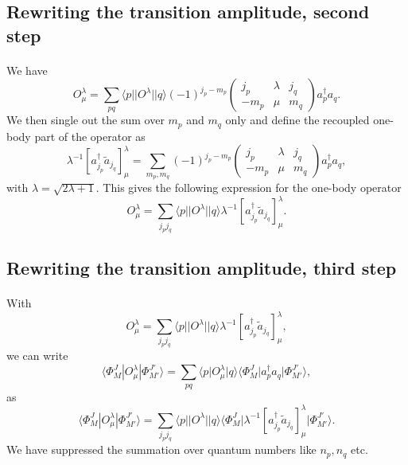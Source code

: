 \documentclass[%
oneside,                 %
final,                   %
10pt]{article}
\begin{document}
\subsection{Rewriting the transition amplitude, second step}

\paragraph{}
We have
\[
O_{\mu}^{\lambda} = \sum_{pq} \langle p \vert \vert O^{\lambda}\vert \vert q \rangle (-1)^{j_p-m_p}\left(\begin{array}{ccc}  j_p & \lambda & j_q \\ -m_p & \mu & m_q\end{array}\right)a^{\dagger}_pa_q.
\]
We then single out the sum over $m_p$ and $m_q$ only and define the recoupled one-body part of the operator as 
\[
\lambda^{-1}\left[ a_{j_p}^{\dagger}\tilde{a}_{j_q}\right]^{\lambda}_{\mu} = \sum_{m_p,m_q} (-1)^{j_p-m_p}\left(\begin{array}{ccc}  j_p & \lambda & j_q \\ -m_p & \mu & m_q\end{array}\right)a^{\dagger}_pa_q,
\]
with $\lambda=\sqrt{2\lambda+1}$.
This gives the following expression for the one-body operator
\[
O_{\mu}^{\lambda} = \sum_{j_pj_q} \langle p \vert \vert O^{\lambda}\vert \vert q \rangle \lambda^{-1}\left[ a_{j_p}^{\dagger}\tilde{a}_{j_q}\right]^{\lambda}_{\mu}.
\]




\subsection{Rewriting the transition amplitude, third step}

\paragraph{}
With 
\[
O_{\mu}^{\lambda} = \sum_{j_pj_q} \langle p \vert \vert O^{\lambda}\vert \vert q \rangle \lambda^{-1}\left[ a_{j_p}^{\dagger}\tilde{a}_{j_q}\right]^{\lambda}_{\mu},
\]
we can write 
\[
\langle \Phi^J_M|O^{\lambda}_{\mu}|\Phi^{J'}_{M'}\rangle = \sum_{pq} \langle p \vert O_{\mu}^{\lambda} \vert q \rangle \langle \Phi_{M}^{J} \vert a^{\dagger}_pa_q \vert \Phi_{M'}^{J'}\rangle,
\]
as
\[
\langle \Phi^J_M|O^{\lambda}_{\mu}|\Phi^{J'}_{M'}\rangle = \sum_{j_pj_q} \langle p \vert \vert O^{\lambda} \vert\vert q \rangle \langle \Phi_{M}^{J}\vert \lambda^{-1}\left[ a_{j_p}^{\dagger}\tilde{a}_{j_q}\right]^{\lambda}_{\mu}  \vert \Phi_{M'}^{J'}\rangle.
\]
We have suppressed the summation over quantum numbers like $n_p,n_q$ etc.
\end{document}
